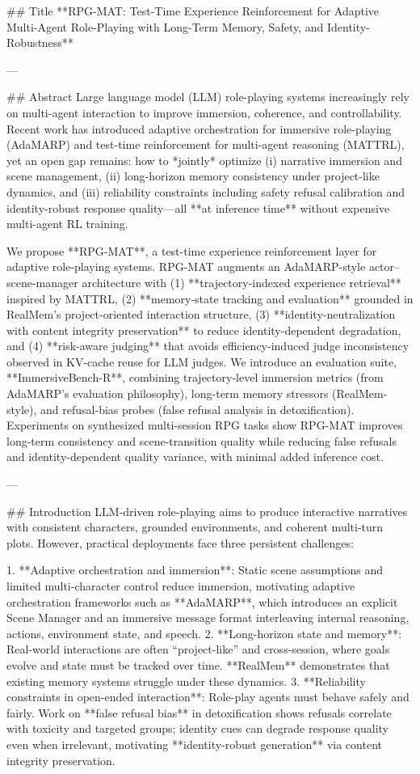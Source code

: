 ## Title  
**RPG-MAT: Test-Time Experience Reinforcement for Adaptive Multi-Agent Role-Playing with Long-Term Memory, Safety, and Identity-Robustness**

---

## Abstract  
Large language model (LLM) role-playing systems increasingly rely on multi-agent interaction to improve immersion, coherence, and controllability. Recent work has introduced adaptive orchestration for immersive role-playing (AdaMARP) and test-time reinforcement for multi-agent reasoning (MATTRL), yet an open gap remains: how to *jointly* optimize (i) narrative immersion and scene management, (ii) long-horizon memory consistency under project-like dynamics, and (iii) reliability constraints including safety refusal calibration and identity-robust response quality—all **at inference time** without expensive multi-agent RL training.  

We propose **RPG-MAT**, a test-time experience reinforcement layer for adaptive role-playing systems. RPG-MAT augments an AdaMARP-style actor–scene-manager architecture with (1) **trajectory-indexed experience retrieval** inspired by MATTRL, (2) **memory-state tracking and evaluation** grounded in RealMem’s project-oriented interaction structure, (3) **identity-neutralization with content integrity preservation** to reduce identity-dependent degradation, and (4) **risk-aware judging** that avoids efficiency-induced judge inconsistency observed in KV-cache reuse for LLM judges. We introduce an evaluation suite, **ImmersiveBench-R**, combining trajectory-level immersion metrics (from AdaMARP’s evaluation philosophy), long-term memory stressors (RealMem-style), and refusal-bias probes (false refusal analysis in detoxification). Experiments on synthesized multi-session RPG tasks show RPG-MAT improves long-term consistency and scene-transition quality while reducing false refusals and identity-dependent quality variance, with minimal added inference cost.

---

## Introduction  
LLM-driven role-playing aims to produce interactive narratives with consistent characters, grounded environments, and coherent multi-turn plots. However, practical deployments face three persistent challenges:

1. **Adaptive orchestration and immersion**: Static scene assumptions and limited multi-character control reduce immersion, motivating adaptive orchestration frameworks such as **AdaMARP**, which introduces an explicit Scene Manager and an immersive message format interleaving internal reasoning, actions, environment state, and speech.  
2. **Long-horizon state and memory**: Real-world interactions are often “project-like” and cross-session, where goals evolve and state must be tracked over time. **RealMem** demonstrates that existing memory systems struggle under these dynamics.  
3. **Reliability constraints in open-ended interaction**: Role-play agents must behave safely and fairly. Work on **false refusal bias** in detoxification shows refusals correlate with toxicity and targeted groups; identity cues can degrade response quality even when irrelevant, motivating **identity-robust generation** via content integrity preservation.


